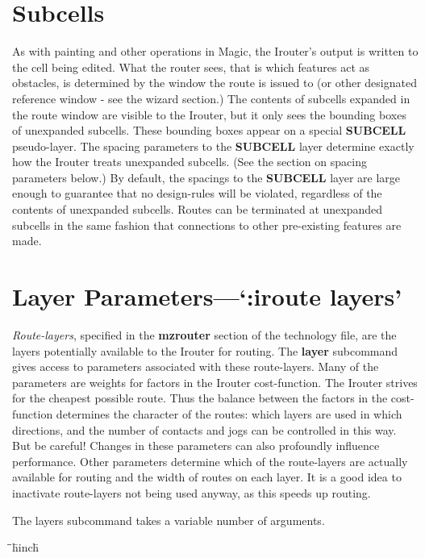 \documentclass[letterpaper,twoside,12pt]{article}
\def\hinch{\hspace*{0.5in}}
\def\starti{\begin{center}\begin{tabbing}\hinch\=\hinch\=\hinch\=hinch\hinch\=\kill}
\def\endi{\end{tabbing}\end{center}}
\def\ii{\>\>\>}
\begin{document}
\section{Subcells}

As with painting and other operations in Magic, the Irouter's
output is written to the cell being edited.  What the router sees, that
is which features act as obstacles, is determined by the
window the route is issued to (or other designated reference window -
see the wizard
section.)  The contents of subcells expanded in the route window 
are visible to the Irouter, but it only sees the bounding boxes
of unexpanded subcells.  These bounding boxes appear on a special 
{\bfseries SUBCELL}  pseudo-layer.  The spacing parameters to the {\bfseries SUBCELL}
layer determine exactly how the Irouter treats unexpanded subcells.
(See the section on spacing parameters below.)  By default, the
spacings to the {\bfseries SUBCELL} layer are large enough to guarantee that
no design-rules will be violated, regardless of the contents of 
unexpanded subcells.  Routes can be terminated
at unexpanded subcells in the same fashion that connections to 
other pre-existing features are made.

\section{Layer Parameters---`:iroute layers'}

{\itshape Route-layers}, specified in the {\bfseries mzrouter} section of the
technology file, are the layers potentially available
to the Irouter for routing.  The {\bfseries layer} subcommand gives access
to parameters associated with these route-layers.   Many of the
parameters are weights for factors in the Irouter cost-function.  The
Irouter strives for the cheapest possible route.  Thus the balance between
the factors in the cost-function determines the character of the
routes:  which layers are used in which directions, and the number of
contacts and jogs can be controlled in this way.  But
be careful!  Changes in these parameters can also
profoundly influence performance.  Other parameters determine 
which of the route-layers are actually available for routing and
the width of routes on each layer.  It is a good idea to inactivate
route-layers not being used anyway, as this speeds up routing.

The layers subcommand takes a variable number of arguments.

\starti
   \ii {\bfseries :iroute layers}
\endi
\end{document}
